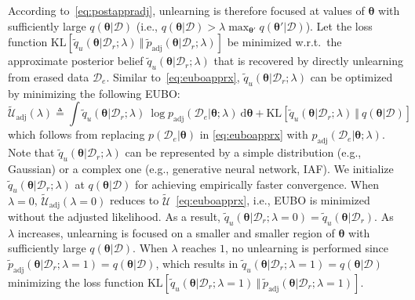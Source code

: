 \documentclass{article}
\theoremstyle{definition}
\newcommand{\mcl}[1]{\mathcal{#1}}
\newcommand{\da}{\mcl{D}}
\newcommand{\dc}{\mcl{D}_r}
\newcommand{\dr}{\mcl{D}_e}
\newcommand{\eubo}{\tilde{q}_u}
\begin{document}
%
According to~\eqref{eq:postappradj}, unlearning is therefore  focused at values of $\bm{\theta}$ with sufficiently large $q(\bm{\theta}|\da)$ (i.e.,
$q(\bm{\theta}|\da) > \lambda \max_{\bm{\theta}'} q(\bm{\theta}'|\da)$).
Let the loss function $\text{KL}[\eubo(\bm{\theta}|\dc; \lambda)\ \Vert\ \tilde{p}_{\text{adj}}(\bm{\theta}|\dc; \lambda)]$ be minimized w.r.t.~the approximate posterior belief $\eubo(\bm{\theta}|\dc; \lambda)$ that is recovered by directly unlearning from erased data $\dr$.
Similar to~\eqref{eq:euboapprx},  %
$\eubo(\bm{\theta}|\dc; \lambda)$ can be optimized by minimizing the following EUBO:
%
\begin{equation}
\widetilde{\mcl{U}}_{\text{adj}}(\lambda) \triangleq \int \eubo(\bm{\theta}|\dc; \lambda)\ \log p_{\text{adj}}(\dr|\bm{\theta}; \lambda)\ \text{d}\bm{\theta} + \text{KL}[\eubo(\bm{\theta}|\dc; \lambda)\ \Vert\ q(\bm{\theta}|\da)]
\label{eq:euboapprxadj}
\end{equation}
%
which follows from replacing $p(\dr|\bm{\theta})$ in \eqref{eq:euboapprx} with $p_{\text{adj}}(\dr|\bm{\theta}; \lambda)$.
Note that $\eubo(\bm{\theta}|\dc; \lambda)$ can be represented by a simple distribution (e.g., Gaussian) or a complex one (e.g., generative neural network, IAF). 
We initialize $\eubo(\bm{\theta}|\dc; \lambda)$ at $q(\bm{\theta}|\da)$ for achieving empirically faster convergence.
When $\lambda=0$, $\widetilde{\mcl{U}}_{\text{adj}}(\lambda=0)$ reduces to $\widetilde{\mcl{U}}$~\eqref{eq:euboapprx}, i.e., EUBO is minimized without the adjusted likelihood. As a result,  $\eubo(\bm{\theta}|\dc; \lambda=0)=\eubo(\bm{\theta}|\dc)$.
As $\lambda$ increases, unlearning is focused on a smaller and smaller region of $\bm{\theta}$ with sufficiently large $q(\bm{\theta}|\da)$.
When $\lambda$ reaches $1$, no unlearning is performed since 
$\tilde{p}_{\text{adj}}(\bm{\theta}|\dc; \lambda=1) = q(\bm{\theta}|\da)$, which results in $\eubo(\bm{\theta}|\dc; \lambda=1) = q(\bm{\theta}|\da)$ minimizing the loss function $\text{KL}[\eubo(\bm{\theta}|\dc; \lambda=1)\ \Vert\ \tilde{p}_{\text{adj}}(\bm{\theta}|\dc; \lambda=1)]$.\vspace{1mm} 
\end{document}
